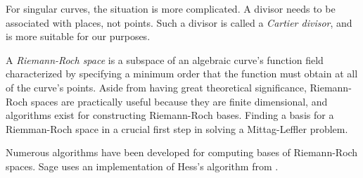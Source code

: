 For singular curves, the situation is more complicated.  A divisor
needs to be associated with places, not points.  Such a divisor is
called a {\it Cartier divisor}, and is more suitable for our purposes.

\vfill\eject
{}

A {\it Riemann-Roch space} is a subspace of an algebraic curve's
function field characterized by specifying a minimum order that the
function must obtain at all of the curve's points.  Aside from having
great theoretical significance, Riemann-Roch spaces are practically
useful because they are finite dimensional, and algorithms exist for
constructing Riemann-Roch bases.  Finding a basis for a Riemman-Roch
space in a crucial first step in solving a Mittag-Leffler problem.

Numerous algorithms have been developed for computing bases of
Riemann-Roch spaces.  Sage uses an implementation of Hess's algorithm
from \cite{hess}.

\begin{comment}
I've implemented in Maxima one of the oldest,
from \cite{bliss}, though it probably dates back
to \cite{dedekind-weber}.

We begin the process with a ${\mathrm C}(x)$-basis for the entire
function field, namely $\{1, y, \ldots, y^{n-1}\}$.

Next, we want to convert this into a ${\mathrm C}[x]$-basis for the
finite portion of the divisor.  First, we multiple the basis by
whatever polynomials in $x$ are required to place the basis elements
into the divisor's function space, then for each value of $x$ form
a matrix of coefficients, and keep reducing until its determinant is zero.

Finally, we need to adjust this basis to match the divisor's requirements at infinity.

A divisor's basis can be transformed to another basis for the same
divisor by multiplying by a matrix in ${\mathrm C}[x]$ with
determinant a constant not equal to zero. (Bliss Th. 21.1)

If we have a cycle at infinity, multiplying by x will multiply
the expansions by (1/t^r).

{\tt riemannroch(f,x,y,divisor)} computes a basis for the Riemann-Roch
space $L(D)$.  {\tt divisor} is a list of elements, each in the form
{\tt [[$x_i$, $y_i$], $\nu_i$]}, where $(x_i, y_i)$ is a point on the
curve, and $\nu_i$ is the order of the divisor at that point.  For
singular points, either the standard syntax can be used, indicating
that the order of the divisor is the same at all points of the
singularity, or $\nu_i$ can be replaced with a list of values, one for
each sheet at the singularity.  The order of sheets is the same
returned by {\tt puiseux}.  Specifying multiple orders at
singularities with cycles is currently not supported.

\end{comment}

